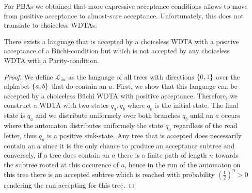 For \acp{PBA} we obtained that more expressive acceptance conditions allows to
move from positive acceptance to almost-sure acceptance. Unfortunately, this 
does not translate to choiceless \acp{WDTA}:
\begin{proposition}
  There exists a language that is accepted by a choiceless \ac{WDTA} with a
  positive acceptance of a Büchi-condition but which is not accepted by any
  choiceless \ac{WDTA} with a Parity-condition.
\end{proposition}
\begin{proof}
  We define $\mathcal{L}_{\exists a}$ as the language of all trees with
  directions $\left\{0,1\right\}$ over the alphabet $\left\{a,b\right\}$ that do contain an $a$.
  First, we show that this language can be accepted by a choiceless Büchi
  \ac{WDTA} with positive acceptance. Therefore, we construct a \ac{WDTA} with 
  two states $q_{a}, q_{b}$ where $q_{b}$ is the initial state. The final state 
  is $q_{a}$ and we distribute uniformely over both branches $q_{b}$ until an 
  $a$ occurs where the automaton distributes uniformely the state $q_{a}$ 
  regardless of the read letter, thus $q_{a}$ is a positive sink-state. Any 
  tree that is accepted does necessarily contain an $a$ since it is the only 
  chance to produce an acceptance subtree and conversely, if a tree does 
  contain an $a$ there is a finite path of length $n$ towards the subtree 
  rooted at this occurence of $a$, hence in the run of the automaton on this 
  tree there is an accepted subtree which is reached with probability 
  $(\frac{1}{2})^{n} > 0$ rendering the run accepting for this tree.


\end{proof}
